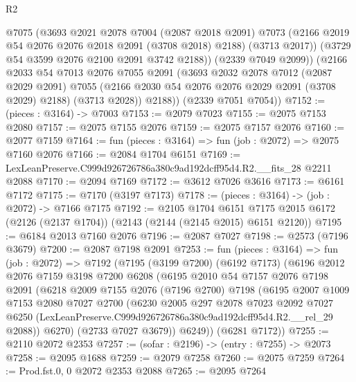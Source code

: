 \begin{lexlean}{R2}
\begin{coremodule}
            @7075
            (@3693
              @2021
              @2078
              @7004
              (@2087 @2018 @2091)
              @7073
              (@2166 @2019 @54 @2076 @2076 @2018 @2091 (@3708 @2018) @2188)
              (@3713 @2017))
            (@3729 @54 @3599 @2076 @2100 @2091 @3742 @2188))
          (@2339 @7049 @2099))
        (@2166
          @2033
          @54
          @7013
          @2076
          @7055
          @2091
          (@3693
            @2032
            @2078
            @7012
            (@2087 @2029 @2091)
            @7055
            (@2166 @2030 @54 @2076 @2076 @2029 @2091 (@3708 @2029) @2188)
            (@3713 @2028))
          @2188))
      (@2339 @7051 @7054))
@7152 := (pieces : @3164) -> @7003
@7153 := @2079 @7023
@7155 := @2075 @7153 @2080
@7157 := @2075 @7155 @2076
@7159 := @2075 @7157 @2076
@7160 := @2077 @7159
@7164 := fun (pieces : @3164) => fun (job : @2072) => @2075 @7160 @2076
@7166 := @2084 @1704 @6151
@7169 := LexLeanPreserve.C999d926726786a380c9ad192dcff95d4.R2.__fits_28 @2211 @2088
@7170 := @2094 @7169
@7172 := @3612 @7026 @3616
@7173 := @6161 @7172
@7175 := @7170 (@3197 @7173)
@7178 := (pieces : @3164) -> (job : @2072) -> @7166 @7175
@7192 := @2105
    @1704
    @6151
    @7175
    @2015
    @6172
    (@2126 (@2137 @1704))
    (@2143 (@2144 (@2145 @2015) @6151 @2120))
@7195 := @6184 @2013 @7160 @2076
@7196 := @2087 @7027
@7198 := @2573 (@7196 @3679)
@7200 := @2087 @7198 @2091
@7253 := fun (pieces : @3164) =>
  fun (job : @2072) =>
  @7192
    (@7195
      (@3199 @7200)
      (@6192 @7173)
      (@6196
        @2012
        @2076
        @7159
        @3198
        @7200
        @6208
        (@6195
          @2010
          @54
          @7157
          @2076
          @7198
          @2091
          (@6218
            @2009
            @7155
            @2076
            (@7196 @2700)
            @7198
            (@6195
              @2007
              @1009
              @7153
              @2080
              @7027
              @2700
              (@6230
                @2005
                @297
                @2078
                @7023
                @2092
                @7027
                @6250
                (LexLeanPreserve.C999d926726786a380c9ad192dcff95d4.R2.__rel_29 @2088))
              @6270)
            (@2733 @7027 @3679))
          @6249))
      (@6281 @7172))
@7255 := @2110 @2072 @2353
@7257 := (sofar : @2196) -> (entry : @7255) -> @2073
@7258 := @2095 @1688
@7259 := @2079 @7258
@7260 := @2075 @7259
@7264 := Prod.fst.{0, 0} @2072 @2353 @2088
@7265 := @2095 @7264

\end{coremodule}
\end{lexlean}
